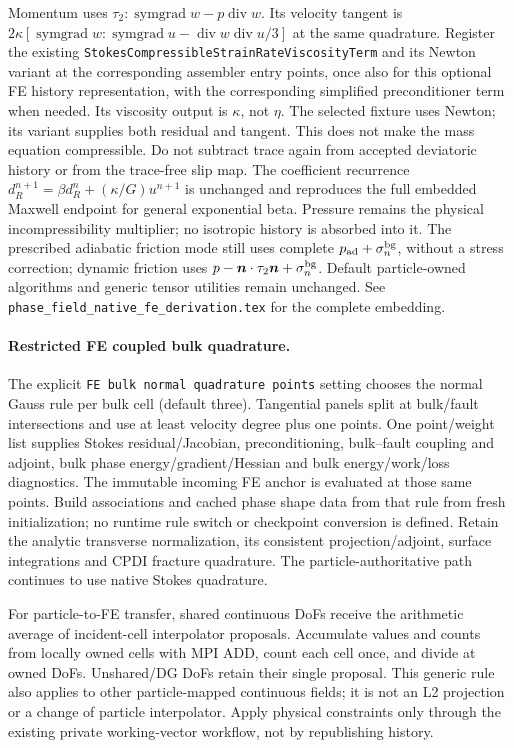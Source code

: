 \documentclass[11pt]{article}
\begin{document}
Momentum uses $\tau_2:\operatorname{symgrad}w-p\operatorname{div}w$.
Its velocity tangent is
$2\kappa[\operatorname{symgrad}w:\operatorname{symgrad}u-
\operatorname{div}w\operatorname{div}u/3]$ at the same quadrature.
Register the existing \texttt{StokesCompressibleStrainRateViscosityTerm} and its
Newton variant at the corresponding assembler entry points, once
also for this optional FE history representation, with the corresponding
simplified preconditioner term when needed. Its viscosity output is $\kappa$,
not $\eta$. The selected fixture uses Newton; its variant supplies both
residual and tangent. This does not make the mass equation compressible. Do not subtract
trace again from accepted deviatoric history or from the trace-free slip map.
The coefficient recurrence $d_R^{n+1}=\beta d_R^n+(\kappa/G)u^{n+1}$ is unchanged
and reproduces the full embedded Maxwell endpoint for general exponential beta.
Pressure remains the physical incompressibility multiplier; no isotropic history
is absorbed into it. The prescribed adiabatic friction mode still uses complete
$p_{\rm ad}+\sigma_n^{\rm bg}$, without a stress correction; dynamic friction
uses $p-\boldsymbol n\cdot\tau_2\boldsymbol n+\sigma_n^{\rm bg}$.
Default particle-owned algorithms and generic tensor utilities remain unchanged.
See \texttt{phase\_field\_native\_fe\_derivation.tex} for the complete embedding.

\paragraph{Restricted FE coupled bulk quadrature.}
The explicit \texttt{FE bulk normal quadrature points} setting chooses the
normal Gauss rule per bulk cell (default three). Tangential panels split at
bulk/fault intersections and use at least velocity degree plus one points.
One point/weight list supplies Stokes residual/Jacobian, preconditioning,
bulk--fault coupling and adjoint, bulk phase energy/gradient/Hessian and bulk
energy/work/loss diagnostics. The immutable incoming FE anchor is evaluated
at those same points. Build associations and cached phase shape data from that
rule from fresh initialization; no runtime rule switch or checkpoint conversion
is defined. Retain the analytic transverse normalization, its consistent
projection/adjoint, surface integrations and CPDI fracture quadrature. The
particle-authoritative path continues to use native Stokes quadrature.

For particle-to-FE transfer, shared continuous DoFs receive the arithmetic
average of incident-cell interpolator proposals. Accumulate values and counts
from locally owned cells with MPI ADD, count each cell once, and divide at
owned DoFs. Unshared/DG DoFs retain their single proposal. This generic rule
also applies to other particle-mapped continuous fields; it is not an L2
projection or a change of particle interpolator. Apply physical constraints
only through the existing private working-vector workflow, not by republishing
history.
\end{document}
